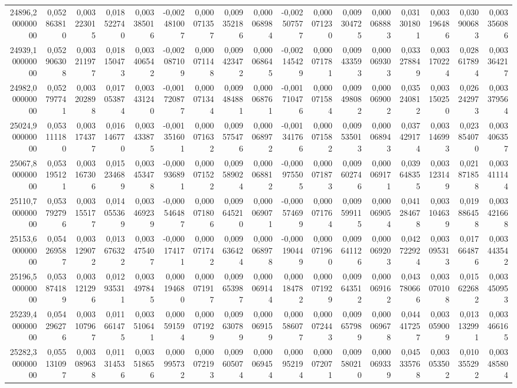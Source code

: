 \begin{longtable}{rrrrrrrrrrrrrrrrr}
24896,200000000 & 0,052863810 & 0,003223015 & 0,018522740 & 0,003385016 & -0,002481007 & 0,000071357 & 0,009352186 & 0,000068984 & -0,002507577 & 0,000071230 & 0,009304725 & 0,000068883 & 0,031301801 & 0,003196486 & 0,030900683 & 0,003356086\\
24939,100000000 & 0,052906308 & 0,003211977 & 0,018150473 & 0,003406542 & -0,002087109 & 0,000071148 & 0,009423472 & 0,000068645 & -0,002145429 & 0,000071781 & 0,009433593 & 0,000069303 & 0,033278849 & 0,003170224 & 0,028617894 & 0,003364217\\
24982,000000000 & 0,052797741 & 0,003202898 & 0,017053874 & 0,003431240 & -0,001720877 & 0,000071344 & 0,009484881 & 0,000068761 & -0,001710476 & 0,000071584 & 0,009498082 & 0,000069002 & 0,035240812 & 0,003150250 & 0,026242973 & 0,003379564\\
25024,900000000 & 0,053111180 & 0,003174377 & 0,016146770 & 0,003433875 & -0,001351601 & 0,000071632 & 0,009575476 & 0,000068972 & -0,001341766 & 0,000071582 & 0,009535013 & 0,000068943 & 0,037429174 & 0,003146993 & 0,023854070 & 0,003406357\\
25067,800000000 & 0,053195121 & 0,003167306 & 0,015234689 & 0,003453478 & -0,000936891 & 0,000071522 & 0,009589024 & 0,000068812 & -0,000975505 & 0,000071873 & 0,009602746 & 0,000069171 & 0,039648355 & 0,003123149 & 0,021871858 & 0,003411144\\
25110,700000000 & 0,053792796 & 0,003155177 & 0,014055369 & 0,003469239 & -0,000546487 & 0,000071806 & 0,009645210 & 0,000069071 & -0,000574699 & 0,000071764 & 0,009599115 & 0,000069054 & 0,041284678 & 0,003104639 & 0,019886458 & 0,003421668\\
25153,600000000 & 0,054269587 & 0,003129072 & 0,013676322 & 0,003475407 & -0,000174171 & 0,000071742 & 0,009636424 & 0,000068978 & -0,000190449 & 0,000071960 & 0,009641126 & 0,000069203 & 0,042722924 & 0,003095313 & 0,017664876 & 0,003443542\\
25196,500000000 & 0,053874189 & 0,003121296 & 0,012935311 & 0,003497845 & 0,000194680 & 0,000071917 & 0,009653987 & 0,000069144 & 0,000184782 & 0,000071929 & 0,009643512 & 0,000069162 & 0,043780666 & 0,003070108 & 0,015622682 & 0,003450953\\
25239,400000000 & 0,054296276 & 0,003107967 & 0,011661475 & 0,003510641 & 0,000591594 & 0,000071929 & 0,009630789 & 0,000069159 & 0,000586077 & 0,000072443 & 0,009657989 & 0,000069678 & 0,044417257 & 0,003059009 & 0,013132991 & 0,003466165\\
25282,300000000 & 0,055131097 & 0,003089638 & 0,011314536 & 0,003518656 & 0,000995732 & 0,000072193 & 0,009605074 & 0,000069454 & 0,000952194 & 0,000072071 & 0,009580210 & 0,000069339 & 0,045335768 & 0,003053502 & 0,010355292 & 0,003485804\\

\end{longtable}
